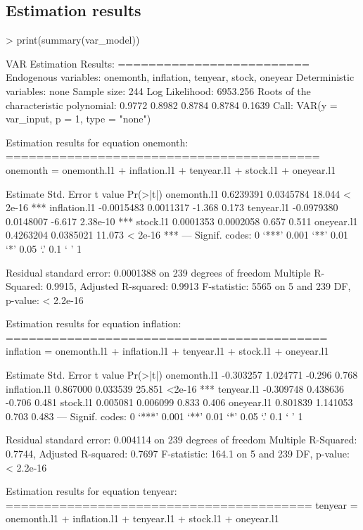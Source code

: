 \documentclass[11pt]{article}
\begin{document}
\subsection{Estimation results}
\begin{Schunk}
\begin{Sinput}
> print(summary(var_model))
\end{Sinput}
\begin{Soutput}
VAR Estimation Results:
========================= 
Endogenous variables: onemonth, inflation, tenyear, stock, oneyear 
Deterministic variables: none 
Sample size: 244 
Log Likelihood: 6953.256 
Roots of the characteristic polynomial:
0.9772 0.8982 0.8784 0.8784 0.1639
Call:
VAR(y = var_input, p = 1, type = "none")


Estimation results for equation onemonth: 
========================================= 
onemonth = onemonth.l1 + inflation.l1 + tenyear.l1 + stock.l1 + oneyear.l1 

               Estimate Std. Error t value Pr(>|t|)    
onemonth.l1   0.6239391  0.0345784  18.044  < 2e-16 ***
inflation.l1 -0.0015483  0.0011317  -1.368    0.173    
tenyear.l1   -0.0979380  0.0148007  -6.617 2.38e-10 ***
stock.l1      0.0001353  0.0002058   0.657    0.511    
oneyear.l1    0.4263204  0.0385021  11.073  < 2e-16 ***
---
Signif. codes:  0 ‘***’ 0.001 ‘**’ 0.01 ‘*’ 0.05 ‘.’ 0.1 ‘ ’ 1


Residual standard error: 0.0001388 on 239 degrees of freedom
Multiple R-Squared: 0.9915,	Adjusted R-squared: 0.9913 
F-statistic:  5565 on 5 and 239 DF,  p-value: < 2.2e-16 


Estimation results for equation inflation: 
========================================== 
inflation = onemonth.l1 + inflation.l1 + tenyear.l1 + stock.l1 + oneyear.l1 

              Estimate Std. Error t value Pr(>|t|)    
onemonth.l1  -0.303257   1.024771  -0.296    0.768    
inflation.l1  0.867000   0.033539  25.851   <2e-16 ***
tenyear.l1   -0.309748   0.438636  -0.706    0.481    
stock.l1      0.005081   0.006099   0.833    0.406    
oneyear.l1    0.801839   1.141053   0.703    0.483    
---
Signif. codes:  0 ‘***’ 0.001 ‘**’ 0.01 ‘*’ 0.05 ‘.’ 0.1 ‘ ’ 1


Residual standard error: 0.004114 on 239 degrees of freedom
Multiple R-Squared: 0.7744,	Adjusted R-squared: 0.7697 
F-statistic: 164.1 on 5 and 239 DF,  p-value: < 2.2e-16 


Estimation results for equation tenyear: 
======================================== 
tenyear = onemonth.l1 + inflation.l1 + tenyear.l1 + stock.l1 + oneyear.l1 


\end{Soutput}
\end{Schunk}
\end{document}
